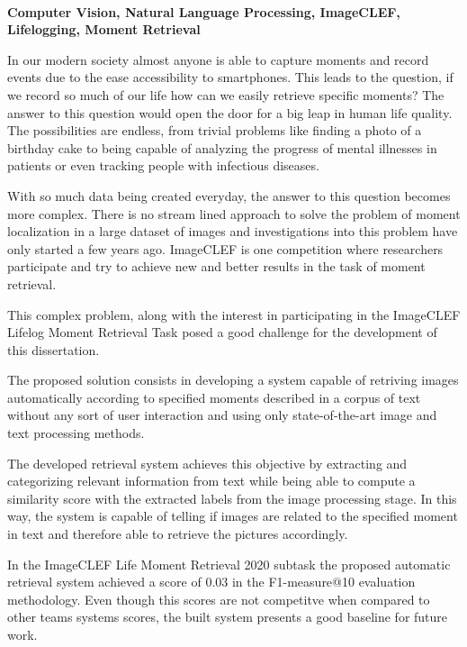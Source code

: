 \EndTitlePage
\titlepage\ \endtitlepage %

\TitlePage
  \vspace*{55mm}
       {\textbf{Computer Vision, Natural Language Processing, ImageCLEF, Lifelogging, Moment Retrieval}}

     {In our modern society almost anyone is able to capture moments and record events due to the ease accessibility to smartphones. This leads to the question, if we record so much of our life how can we easily retrieve specific moments? The answer to this question would open the door for a big leap in human life quality. The possibilities are endless, from trivial problems like finding a photo of a birthday cake to being capable of analyzing the progress of mental illnesses in patients or even tracking people with infectious diseases.}

     \TEXT{}
     {With so much data being created everyday, the answer to this question becomes more complex. There is no stream lined approach to solve the problem of moment localization in a large dataset of images and investigations into this problem have only started a few years ago. ImageCLEF is one competition where researchers participate and try to achieve new and better results in the task of moment retrieval.}

     \TEXT{}
     {This complex problem, along with the interest in participating in the ImageCLEF Lifelog Moment Retrieval Task posed a good challenge for the development of this dissertation.}

     \TEXT{}
     {The proposed solution consists in developing a system capable of retriving images automatically  according to specified moments described in a corpus of text without any sort of user interaction and using only state-of-the-art image and text processing methods.}

     \TEXT{}
     {The developed retrieval system achieves this objective by extracting and categorizing relevant information from text while being able to compute a similarity score with the extracted labels from the image processing stage. In this way, the system is capable of telling if images are related to the specified moment in text and therefore able to retrieve the pictures accordingly.}

     \TEXT{}
     {In the ImageCLEF Life Moment Retrieval 2020 subtask the proposed automatic retrieval system achieved a score of 0.03 in the F1-measure@10 evaluation methodology. Even though this scores are not competitve when compared to other teams systems scores, the built system presents a good baseline for future work. }

\EndTitlePage
\titlepage\ \endtitlepage %
